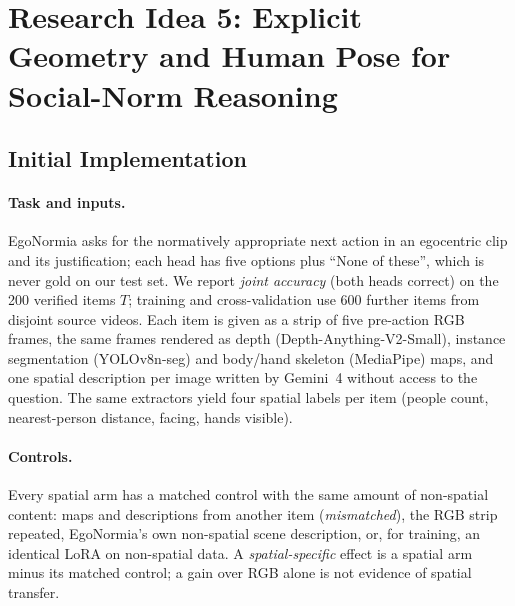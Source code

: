 \section{Research Idea 5: Explicit Geometry and Human Pose for Social-Norm Reasoning}
\subsection{Initial Implementation}
\label{sec:idea5-impl}

\paragraph{Task and inputs.}
EgoNormia asks for the normatively appropriate next action in an egocentric clip and its justification; each head has five options plus ``None of these'', which is never gold on our test set. We report \emph{joint accuracy} (both heads correct) on the 200 verified items $T$; training and cross-validation use 600 further items from disjoint source videos. Each item is given as a strip of five pre-action RGB frames, the same frames rendered as depth (Depth-Anything-V2-Small), instance segmentation (YOLOv8n-seg) and body/hand skeleton (MediaPipe) maps, and one spatial description per image written by Gemini~4 without access to the question. The same extractors yield four spatial labels per item (people count, nearest-person distance, facing, hands visible).

\paragraph{Controls.}
Every spatial arm has a matched control with the same amount of non-spatial content: maps and descriptions from another item (\emph{mismatched}), the RGB strip repeated, EgoNormia's own non-spatial scene description, or, for training, an identical LoRA on non-spatial data. A \emph{spatial-specific} effect is a spatial arm minus its matched control; a gain over RGB alone is not evidence of spatial transfer.

